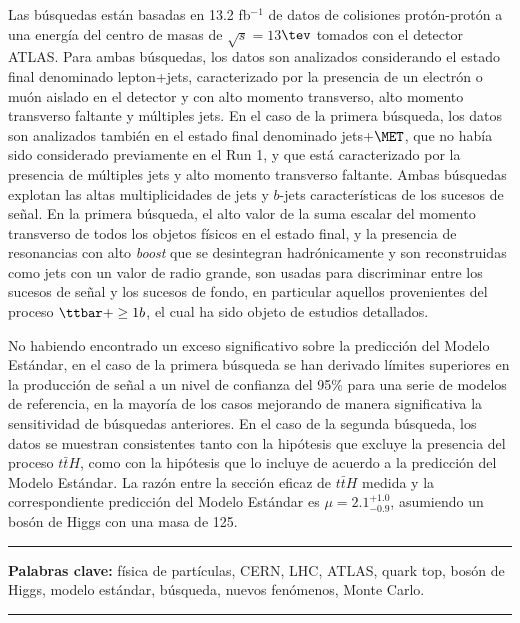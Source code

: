 Las b\'usquedas est\'an basadas en 13.2 fb$^{-1}$ de datos de colisiones prot\'on-prot\'on a una energ\'ia del centro de masas de $\sqrt{s}=13$$\tev$ tomados con el detector ATLAS. Para ambas b\'usquedas, los datos son analizados considerando el estado final denominado lepton+jets, caracterizado por la presencia de un
electr\'on o mu\'on aislado en el detector y con alto momento transverso, alto momento transverso faltante y m\'ultiples jets. En el caso de la primera b\'usqueda, los datos son analizados tambi\'en en el estado final denominado jets+$\MET$, que no hab\'ia sido considerado previamente en el Run 1, y que est\'a caracterizado por la presencia de m\'ultiples jets y alto momento transverso faltante. Ambas b\'usquedas explotan las altas multiplicidades de jets y $b$-jets caracter\'isticas de los sucesos de se\~nal. En la primera b\'usqueda, el alto valor de la suma escalar del momento transverso de todos los objetos f\'isicos en el estado final, y la presencia de resonancias con alto {\sl boost} que se desintegran hadr\'onicamente y son reconstruidas como jets con un valor de radio grande, son usadas para discriminar entre los sucesos de se\~nal y los sucesos de fondo, en particular aquellos provenientes del proceso $\ttbar+\ge1b$, el cual ha sido objeto de estudios detallados.\par
No habiendo encontrado un exceso significativo sobre la predicci\'on del Modelo Est\'andar, en el caso de la primera b\'usqueda se han derivado l\'imites superiores en la producci\'on de se\~nal a un nivel de confianza del 95\% para una serie de modelos de referencia, en la mayor\'ia de los casos mejorando de manera significativa la sensitividad de b\'usquedas anteriores. En el caso de la segunda b\'usqueda, los datos se muestran consistentes tanto con la hip\'otesis que excluye la presencia del proceso $t\bar{t}H$, como con la hip\'otesis que lo incluye de acuerdo a la predicci\'on del Modelo Est\'andar. La raz\'on entre la secci\'on eficaz de $t\bar{t}H$ medida y la correspondiente predicci\'on del Modelo Est\'andar es $\mu=2.1^{+1.0}_{-0.9}$, asumiendo un bos\'on de Higgs con una masa de 125\gev.

\vspace{0.5cm}

\begin{center}
\rule{\linewidth}{.4pt} 
\end{center}
\textbf{Palabras clave:} f\'isica de part\'iculas, CERN, LHC, ATLAS, quark top, bos\'on de Higgs, modelo est\'andar, b\'usqueda, nuevos fen\'omenos, Monte Carlo.
\begin{center}
\rule{\linewidth}{.4pt}
\end{center}




